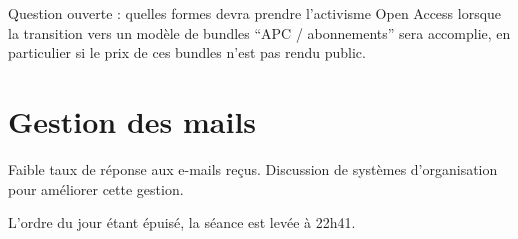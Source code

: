 \documentclass[a4paper]{article}
\begin{document}
Question ouverte : quelles formes devra prendre l'activisme Open Access lorsque la transition vers un modèle de bundles ``APC / abonnements'' sera accomplie, en particulier si le prix de ces bundles n'est pas rendu public.


\section{Gestion des mails}
Faible taux de réponse aux e-mails reçus. Discussion de systèmes d'organisation pour améliorer cette gestion.



\bigskip

L'ordre du jour étant épuisé, la séance est levée à 22h41. 
\end{document}
